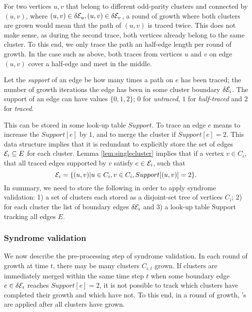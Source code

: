For two vertices $u,v$ that belong to different odd-parity clusters and connected by $(u,v)$, where $(u,v)\in\delta \mathcal{E}_u, (u,v) \in \delta \mathcal{E}_v$, a round of growth where both clusters are grown would mean that the path of $(u,v)$ is traced twice. This does not make sense, as during the second trace, both vertices already belong to the same cluster. To this end, we only trace the path an half-edge length per round of growth. In the case such as above, both traces from vertices $u$ and $v$ on edge $(u,v)$ cover a half-edge and meet in the middle. 
\begin{definition}\label{def:support}
  Let the \emph{support} of an edge be how many times a path on $e$ has been traced; the number of growth iterations the edge has been in some cluster boundary $\delta\mathcal{E}_i$. The support of an edge can have values $\{0,1,2\}$; $0$ for \emph{untraced}, $1$ for \emph{half-traced} and $2$ for \emph{traced}.
\end{definition}
This can be stored in some look-up table $Support$. To trace an edge $e$ means to increase the $Support[e]$ by $1$, and to merge the cluster if $Support[e]=2$. This data structure implies that it is redundant to explicitly store the set of edges $\mathcal{E}_i\subseteq E$ for each cluster. Lemma \ref{lem:singlecluster} implies that if a vertex $v\in C_i$, that all traced edges supported by $v$ satisfy $e \in \mathcal{E}_i$, such that
\begin{equation}
  \mathcal{E}_i = \{(u,v)|u\in C_i, v \in C_i, Support[(u,v)]=2\}.
\end{equation}
In summary, we need to store the following in order to apply syndrome validation:
1) a set of clusters each stored as a disjoint-set tree of vertices $C_i$; 2) for each cluster the list of boundary edges $\delta \mathcal{E}_i$ and 3) a look-up table Support tracking all edges $E$. 

\subsubsection{Syndrome validation}
We now describe the pre-processing step of syndrome validation. In each round of growth at time $t$, there may be many clusters $C_{i,t}$ grown. If clusters are immediately merged within the same time step $t$ when some boundary edge $e\in \delta \mathcal{E}_i$ reaches $Support[e]=2$, it is not possible to track which clusters have completed their growth and which have not. To this end, in a round of growth,  's are applied after all clusters have grown.

